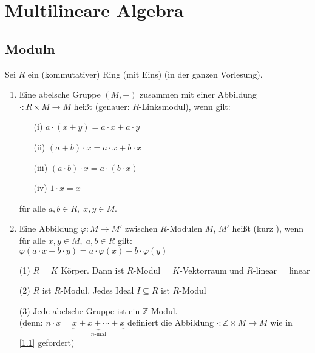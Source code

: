 \chapter{Multilineare Algebra}

\section{Moduln}

Sei $R$ ein (kommutativer) Ring (mit Eins) (in der ganzen Vorlesung).

\begin{Def}
\label{1.1}
  \begin{enumerate}
    \item Eine abelsche Gruppe $(M,+)$ zusammen mit einer Abbildung
          $\cdot : R \times M \to M$ heißt  (genauer:
          $R$-Linksmodul), wenn gilt:
          \begin{enumerate}
            \item[(i)] $a \cdot (x+y) = a \cdot x + a \cdot y$
            \item[(ii)] $(a+b) \cdot x = a \cdot x + b \cdot x$
            \item[(iii)] $(a \cdot b) \cdot x = a \cdot (b \cdot x)$
            \item[(iv)] $1 \cdot x = x$
          \end{enumerate}
          für alle $a,b \in R,\;x,y \in M$.
    \item Eine Abbildung $\varphi: M \to M'$ zwischen $R$-Modulen $M$, $M'$
          heißt  (kurz
          ), wenn für alle $x,y \in M, \; a,b \in R$
          gilt:\\
          $\varphi (a \cdot x + b \cdot y) = a \cdot \varphi (x) + b \cdot
          \varphi (y)$
  \end{enumerate}
\end{Def}

\begin{nnBsp}
  \begin{enumerate}
    \item[(1)] $R = K$ Körper. Dann ist $R$-Modul = $K$-Vektorraum und
               $R$-linear = linear
    \item[(2)] $R$ ist $R$-Modul. Jedes Ideal $I \subseteq R$ ist $R$-Modul
    \item[(3)] Jede abelsche Gruppe ist ein $\mathbb{Z}$-Modul.\\
               (denn: $n \cdot x = \underbrace{x + x + \cdots + x}_{n\text{-mal}}$
               definiert die Abbildung $\cdot: \mathbb{Z} \times M \to M$
               wie in \ref{1.1} gefordert)
  \end{enumerate}
\end{nnBsp}

